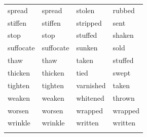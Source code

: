 \documentclass[output=paper]{langsci/langscibook}
\begin{document}
\begin{paperappendix}
{\begin{tabularx}{\textwidth}{XXXX}
spread    & spread    & stolen    & rubbed\\
stiffen   & stiffen   & stripped  & sent\\
stop      & stop      & stuffed   & shaken\\
suffocate & suffocate & sunken    & sold\\
thaw      & thaw      & taken     & stuffed\\
thicken   & thicken   & tied      & swept\\
tighten   & tighten   & varnished & taken\\
weaken    & weaken    & whitened  & thrown\\
worsen    & worsen    & wrapped   & wrapped\\
wrinkle   & wrinkle   & written   & written\\
\lspbottomrule
\end{tabularx}}


\end{paperappendix}
\end{document}
